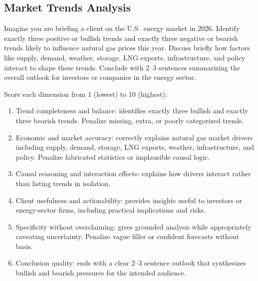 \subsection{Market Trends Analysis}
\label{appendix:market}

\begin{tcolorbox}[taskprompt, title=Task Prompt — Market Trends Analysis]
Imagine you are briefing a client on the U.S.\ energy market in 2026. Identify
exactly three positive or bullish trends and exactly three negative or bearish trends
likely to influence natural gas prices this year. Discuss briefly how factors like
supply, demand, weather, storage, LNG exports, infrastructure, and policy interact
to shape these trends. Conclude with 2--3 sentences summarizing the overall outlook
for investors or companies in the energy sector.
\end{tcolorbox}

\begin{tcolorbox}[rubricbox, title=Evaluation Rubric — Market Trends Analysis]
Score each dimension from 1 (lowest) to 10 (highest):
\begin{enumerate}
  \setlength{\itemsep}{0pt}
  \item Trend completeness and balance: identifies exactly three bullish and
        exactly three bearish trends. Penalize missing, extra, or poorly
        categorized trends.
  \item Economic and market accuracy: correctly explains natural gas market
        drivers including supply, demand, storage, LNG exports, weather,
        infrastructure, and policy. Penalize fabricated statistics or
        implausible causal logic.
  \item Causal reasoning and interaction effects: explains how drivers interact
        rather than listing trends in isolation.
  \item Client usefulness and actionability: provides insights useful to investors
        or energy-sector firms, including practical implications and risks.
  \item Specificity without overclaiming: gives grounded analysis while
        appropriately caveating uncertainty. Penalize vague filler or confident
        forecasts without basis.
  \item Conclusion quality: ends with a clear 2--3 sentence outlook that
        synthesizes bullish and bearish pressures for the intended audience.
\end{enumerate}
\end{tcolorbox}
